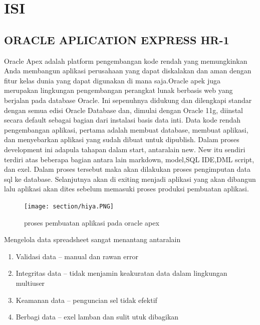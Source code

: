 \chapter{ISI}

\section{ORACLE APLICATION EXPRESS HR-1}
Oracle Apex adalah platform pengembangan kode rendah yang memungkinkan Anda membangun aplikasi perusahaan yang dapat diskalakan dan aman dengan fitur kelas dunia yang dapat digunakan di mana saja.Oracle apek juga merupakan lingkungan pengembangan perangkat lunak berbasis web yang berjalan pada database Oracle. Ini sepenuhnya didukung dan dilengkapi standar dengan semua edisi Oracle Database dan, dimulai dengan Oracle 11g, diinstal secara default sebagai bagian dari instalasi basis data inti. Data kode rendah pengembangan aplikasi, pertama adalah membuat database, membuat aplikasi, dan menyebarkan aplikasi yang sudah dibuat untuk dipublish. Dalam proses development ini adapula tahapan dalam start, antaralain new. New itu sendiri terdiri atas beberapa bagian antara lain markdown, model,SQL IDE,DML script, dan exel. Dalam proses tersebut maka akan dilakukan proses pengimputan data sql ke database. Selanjutnya akan di exiting menjadi aplikasi yang akan dibangun lalu aplikasi akan dites sebelum memasuki proses produksi pembuatan aplikasi. 
\begin{figure}[!htbp]
    \centering
    \texttt{[image: section/hiya.PNG]}
    \caption{proses pembuatan aplikasi pada oracle apex}
    \label{gambar 1}
\end{figure}



Mengelola data spreadsheet sangat menantang antaralain
  \begin{enumerate}
      \item Validasi data    -- manual dan rawan error
      \item Integritas data  -- tidak menjamin keakuratan data dalam lingkungan multiuser
      \item Keamanan data    -- penguncian sel tidak efektif
      \item Berbagi data     -- exel lamban dan sulit utuk dibagikan
  \end{enumerate}  
  
